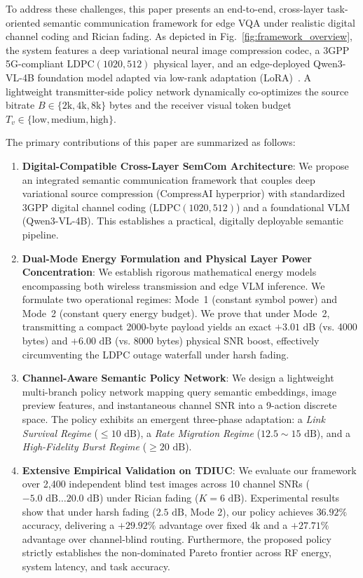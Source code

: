 To address these challenges, this paper presents an end-to-end, cross-layer task-oriented semantic communication framework for edge VQA under realistic digital channel coding and Rician fading. As depicted in Fig.~\ref{fig:framework_overview}, the system features a deep variational neural image compression codec, a 3GPP 5G-compliant $\text{LDPC}(1020, 512)$ physical layer, and an edge-deployed Qwen3-VL-4B foundation model adapted via low-rank adaptation (LoRA)~\cite{hu2021lora,dettmers2024qlora}. A lightweight transmitter-side policy network dynamically co-optimizes the source bitrate $B \in \{2\text{k}, 4\text{k}, 8\text{k}\}$ bytes and the receiver visual token budget $T_v \in \{\mathrm{low}, \mathrm{medium}, \mathrm{high}\}$.

The primary contributions of this paper are summarized as follows:
\begin{enumerate}
    \item \textbf{Digital-Compatible Cross-Layer SemCom Architecture}: We propose an integrated semantic communication framework that couples deep variational source compression (CompressAI hyperprior) with standardized 3GPP digital channel coding ($\text{LDPC}(1020, 512)$) and a foundational VLM (Qwen3-VL-4B). This establishes a practical, digitally deployable semantic pipeline.
    \item \textbf{Dual-Mode Energy Formulation and Physical Layer Power Concentration}: We establish rigorous mathematical energy models encompassing both wireless transmission and edge VLM inference. We formulate two operational regimes: Mode~1 (constant symbol power) and Mode~2 (constant query energy budget). We prove that under Mode~2, transmitting a compact 2000-byte payload yields an exact $+3.01\text{ dB}$ (vs. 4000 bytes) and $+6.00\text{ dB}$ (vs. 8000 bytes) physical SNR boost, effectively circumventing the LDPC outage waterfall under harsh fading.
    \item \textbf{Channel-Aware Semantic Policy Network}: We design a lightweight multi-branch policy network mapping query semantic embeddings, image preview features, and instantaneous channel SNR into a 9-action discrete space. The policy exhibits an emergent three-phase adaptation: a \emph{Link Survival Regime} ($\le 10\text{ dB}$), a \emph{Rate Migration Regime} ($12.5 \sim 15\text{ dB}$), and a \emph{High-Fidelity Burst Regime} ($\ge 20\text{ dB}$).
    \item \textbf{Extensive Empirical Validation on TDIUC}: We evaluate our framework over 2,400 independent blind test images across 10 channel SNRs ($-5.0\text{ dB} \dots 20.0\text{ dB}$) under Rician fading ($K=6\text{ dB}$). Experimental results show that under harsh fading ($2.5\text{ dB}$, Mode 2), our policy achieves $36.92\%$ accuracy, delivering a $+29.92\%$ advantage over fixed 4k and a $+27.71\%$ advantage over channel-blind routing. Furthermore, the proposed policy strictly establishes the non-dominated Pareto frontier across RF energy, system latency, and task accuracy.
\end{enumerate}


